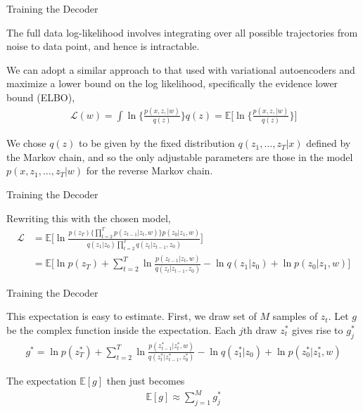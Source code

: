 \documentclass[aspectratio=169,xcolor=dvipsnames]{beamer}
\theoremstyle{named}
\begin{document}

\begin{frame}{Training the Decoder}

The full data log-likelihood involves integrating over all possible trajectories from noise to data point, and hence is intractable.

\vspace{0.3cm}

We can adopt a similar approach to that used with variational autoencoders and maximize a lower bound on the log likelihood, specifically the \alert{evidence lower bound (ELBO)},
\begin{align*}
    \mathcal{L}(w) = \int \ln \bigg\{ \frac{p(x, z, | w)}{q(z)} \bigg\} q(z) = \mathbb{E}\bigg[ \ln \bigg\{ \frac{p(x, z, | w)}{q(z)} \bigg\} \bigg]
\end{align*}

We chose $q(z)$ to be given by the fixed distribution $q(z_1, \dots, z_T |x)$ defined by the Markov chain, and so the only adjustable parameters are those in the model $p(x, z_1, \dots, z_T |w)$ for the reverse Markov chain.

\end{frame}


\begin{frame}{Training the Decoder}

Rewriting this with the chosen model,
\begin{align*}
    \mathcal{L} &= \mathbb{E}\bigg[ \ln \frac{p(z_T)  \big\{\prod^T_{t=2} p(z_{t-1} | z_t, w) \big\} p(z_0 | z_1, w) }{q(z_1 | z_0) \prod^T_{t=2} q(z_t | z_{t-1}, z_0)} \bigg] \\
    &= \mathbb{E} \bigg[ \ln p(z_T) + \sum^T_{t=2} \ln \frac{p(z_{t-1} | z_t, w)}{q(z_t | z_{t-1}, z_0)} - \ln q(z_1 | z_0) + \ln p(z_0 | z_1, w) \bigg]
\end{align*}

\end{frame}


\begin{frame}{Training the Decoder}

This expectation is easy to estimate. First, we draw set of $M$ samples of $z_t$. Let $g$ be the complex function inside the expectation. Each $j$th draw $z_t^*$ gives rise to $g^*_j$
\begin{align*}
    g^* = \ln p(z^*_T) + \sum^T_{t=2} \ln \frac{p(z^*_{t-1} | z^*_t, w)}{q(z^*_t | z^*_{t-1}, z^*_0)} - \ln q(z^*_1 | z_0) + \ln p(z^*_0 | z^*_1, w)
\end{align*}

The expectation $\mathbb{E}[g]$ then just becomes
\begin{align*}
    \mathbb{E}[g] \approx \sum^M_{j=1} g^*_j
\end{align*}

\end{frame}
\end{document}
